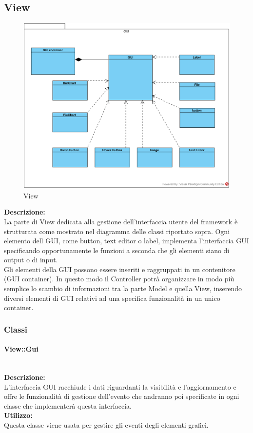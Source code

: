 \begin{samepage}
\subsection{View}
\begin{figure}[H]
	\centering
	\includegraphics[width=14cm]{diagrammi_img/classi_e_package/gui_classes.png}
	\caption{View}
\end{figure}
\end{samepage}
\textbf{Descrizione:}\\
La parte di View dedicata alla gestione dell'interfaccia utente del framework è strutturata come mostrato nel diagramma delle classi riportato sopra.
Ogni elemento dell GUI, come button, text editor o label, implementa l'interfaccia GUI specificando opportunamente le funzioni a seconda che gli elementi siano di output o di input.\\
Gli elementi della GUI possono essere inseriti e raggruppati in un contenitore (GUI container). In questo modo il Controller potrà organizzare in modo più semplice lo scambio di informazioni tra la parte Model e quella View, inserendo diversi elementi di GUI relativi ad una specifica funzionalità in un unico container.

\subsubsection{Classi}

\paragraph{View\-::Gui}\label{gui}\mbox{}\\
\textbf{Descrizione:}\\
L'interfaccia GUI racchiude i dati riguardanti la visibilità e l'aggiornamento e offre le funzionalità di gestione dell'evento che andranno poi specificate in ogni classe che implementerà questa interfaccia.\\
\textbf{Utilizzo:}\\
Questa classe viene usata per gestire gli eventi degli elementi grafici.

